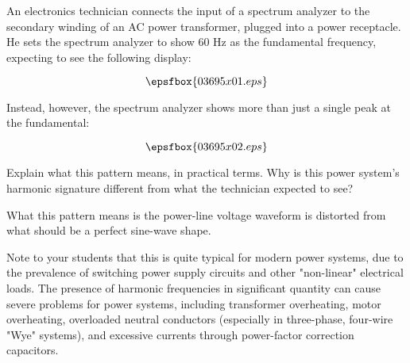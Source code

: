 

An electronics technician connects the input of a spectrum analyzer to the secondary winding of an AC power transformer, plugged into a power receptacle.  He sets the spectrum analyzer to show 60 Hz as the fundamental frequency, expecting to see the following display:

$$\epsfbox{03695x01.eps}$$

Instead, however, the spectrum analyzer shows more than just a single peak at the fundamental:

$$\epsfbox{03695x02.eps}$$

Explain what this pattern means, in practical terms.  Why is this power system's harmonic signature different from what the technician expected to see?







What this pattern means is the power-line voltage waveform is distorted from what should be a perfect sine-wave shape.







Note to your students that this is quite typical for modern power systems, due to the prevalence of switching power supply circuits and other "non-linear" electrical loads.  The presence of harmonic frequencies in significant quantity can cause severe problems for power systems, including transformer overheating, motor overheating, overloaded neutral conductors (especially in three-phase, four-wire "Wye" systems), and excessive currents through power-factor correction capacitors.




